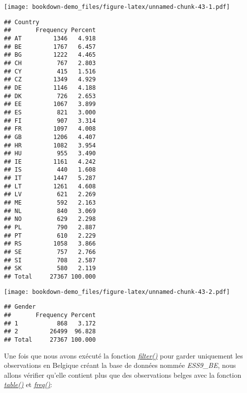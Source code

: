 \documentclass[
]{book}
\newenvironment{Shaded}{\begin{snugshade}}{\end{snugshade}}
\newcommand{\CommentTok}[1]{\textcolor[rgb]{0.56,0.35,0.01}{\textit{#1}}}
\newcommand{\DecValTok}[1]{\textcolor[rgb]{0.00,0.00,0.81}{#1}}
\newcommand{\FunctionTok}[1]{\textcolor[rgb]{0.00,0.00,0.00}{#1}}
\newcommand{\NormalTok}[1]{#1}
\newcommand{\OtherTok}[1]{\textcolor[rgb]{0.56,0.35,0.01}{#1}}
\newcommand{\SpecialCharTok}[1]{\textcolor[rgb]{0.00,0.00,0.00}{#1}}
\newcommand{\StringTok}[1]{\textcolor[rgb]{0.31,0.60,0.02}{#1}}
\begin{document}
\begin{Shaded}
\end{Shaded}

\texttt{[image: bookdown-demo\_files/figure-latex/unnamed-chunk-43-1.pdf]}

\begin{verbatim}
## Country 
##       Frequency Percent
## AT         1346   4.918
## BE         1767   6.457
## BG         1222   4.465
## CH          767   2.803
## CY          415   1.516
## CZ         1349   4.929
## DE         1146   4.188
## DK          726   2.653
## EE         1067   3.899
## ES          821   3.000
## FI          907   3.314
## FR         1097   4.008
## GB         1206   4.407
## HR         1082   3.954
## HU          955   3.490
## IE         1161   4.242
## IS          440   1.608
## IT         1447   5.287
## LT         1261   4.608
## LV          621   2.269
## ME          592   2.163
## NL          840   3.069
## NO          629   2.298
## PL          790   2.887
## PT          610   2.229
## RS         1058   3.866
## SE          757   2.766
## SI          708   2.587
## SK          580   2.119
## Total     27367 100.000
\end{verbatim}

\begin{Shaded}
\end{Shaded}

\texttt{[image: bookdown-demo\_files/figure-latex/unnamed-chunk-43-2.pdf]}

\begin{verbatim}
## Gender 
##       Frequency Percent
## 1           868   3.172
## 2         26499  96.828
## Total     27367 100.000
\end{verbatim}

Une fois que nous avons exécuté la fonction \href{https://dplyr.tidyverse.org/reference/filter.html}{\emph{filter()}} pour garder uniquement les observations en Belgique créant la base de données nommée \emph{ESS9\_BE}, nous allons vérifier qu'elle contient plus que des observations belges avec la fonction \href{https://www.rdocumentation.org/packages/base/versions/3.6.2/topics/table}{\emph{table()}} et \href{https://www.rdocumentation.org/packages/descr/versions/1.1.5/topics/freq}{\emph{freq()}}:
\end{document}
